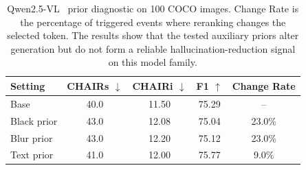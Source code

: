 \documentclass[11pt]{article}
\begin{document}
\begin{table}[h]
  \centering
  \small
  \setlength{\tabcolsep}{4.0pt}
  \begin{tabular}{lcccc}
  \hline
  Setting & CHAIRs $\downarrow$ & CHAIRi $\downarrow$ & F1 $\uparrow$ & Change Rate \\
  \hline
  Base & 40.0 & 11.50 & 75.29 & -- \\
  Black prior & 43.0 & 12.08 & 75.04 & 23.0\% \\
  Blur prior & 43.0 & 12.20 & 75.12 & 23.0\% \\
  Text prior & 41.0 & 12.00 & 75.77 & 9.0\% \\
  \hline
  \end{tabular}
  \caption{
  Qwen2.5-VL~\citep{qwen25vl2025technicalreport} prior diagnostic on 100 COCO images.
  Change Rate is the percentage of triggered events where reranking changes the selected token.
  The results show that the tested auxiliary priors alter generation but do not form a reliable hallucination-reduction signal on this model family.
  }
  \label{tab:qwen_prior_diagnostic}
\end{table}

\clearpage
\end{document}
